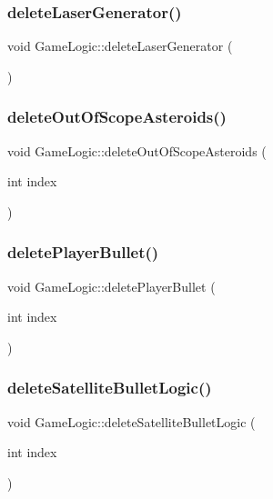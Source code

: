 \subsubsection{\texorpdfstring{delete\+Laser\+Generator()}{deleteLaserGenerator()}}
{\footnotesize\ttfamily void Game\+Logic\+::delete\+Laser\+Generator (\begin{DoxyParamCaption}{ }\end{DoxyParamCaption})}

\mbox{\label{class_game_logic_ae2bb92c22bea679a7467c592f253263b}} 
\subsubsection{\texorpdfstring{delete\+Out\+Of\+Scope\+Asteroids()}{deleteOutOfScopeAsteroids()}}
{\footnotesize\ttfamily void Game\+Logic\+::delete\+Out\+Of\+Scope\+Asteroids (\begin{DoxyParamCaption}\item[{int}]{index }\end{DoxyParamCaption})}

\mbox{\label{class_game_logic_ae5629e5f0bf316435c6b4f40171755b9}} 
\subsubsection{\texorpdfstring{delete\+Player\+Bullet()}{deletePlayerBullet()}}
{\footnotesize\ttfamily void Game\+Logic\+::delete\+Player\+Bullet (\begin{DoxyParamCaption}\item[{int}]{index }\end{DoxyParamCaption})}

\mbox{\label{class_game_logic_a4527756097ff2039fd91daad430e8598}} 
\subsubsection{\texorpdfstring{delete\+Satellite\+Bullet\+Logic()}{deleteSatelliteBulletLogic()}}
{\footnotesize\ttfamily void Game\+Logic\+::delete\+Satellite\+Bullet\+Logic (\begin{DoxyParamCaption}\item[{int}]{index }\end{DoxyParamCaption})}

